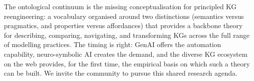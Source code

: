 \documentclass[runningheads]{llncs}
\newenvironment{inboth}{}{}
\begin{document}
\begin{inboth}
The ontological continuum is the missing conceptualisation for principled KG reengineering: a vocabulary organised around two distinctions (semantics versus pragmatics, and properties versus affordances) that provides a backbone theory for describing, comparing, navigating, and transforming KGs across the full range of modelling practices.
The timing is right: GenAI offers the automation capability, neuro-symbolic AI creates the demand, and the diverse KG ecosystem on the web provides, for the first time, the empirical basis on which such a theory can be built.
We invite the community to pursue this shared research agenda.
\end{inboth}




%


\end{document}
